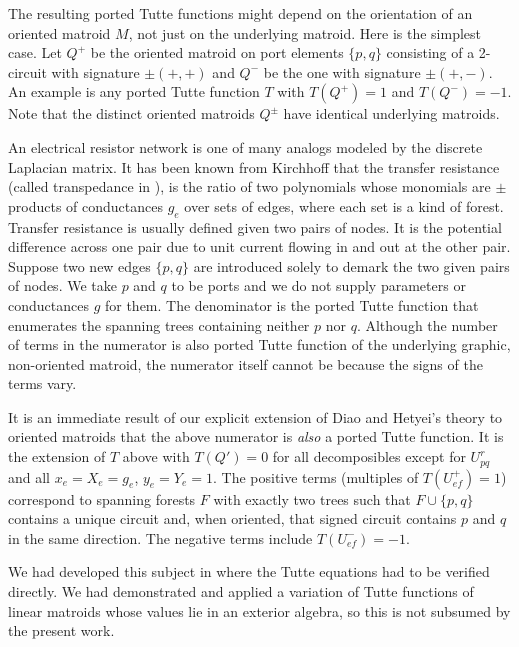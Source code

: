\documentclass[12pt,leqno]{amsart}
\theoremstyle{remark}
\begin{document}
The resulting
ported Tutte functions might depend on the orientation
of an oriented matroid $M$, not just on the
underlying matroid.  Here is the simplest case.
Let $Q^+$ be the oriented matroid
on port elements $\{p,q\}$ consisting of a 2-circuit
with signature $\pm(+,+)$ and $Q^-$ be the one with
signature $\pm(+,-)$.  An example is any ported Tutte
function $T$ with $T(Q^+)=1$ and $T(Q^-)=-1$.  Note that
the distinct oriented matroids $Q^{\pm}$ have identical 
underlying matroids.

An electrical resistor network is one of many analogs
modeled by the 
discrete Laplacian matrix\cite{DoyleSnellBook}.
It has been known from Kirchhoff\cite{Kirchhoff} that 
the transfer resistance
(called transpedance in \cite{BSST,TutteGraphBook}), 
is the ratio of two polynomials whose monomials 
are $\pm$ products of conductances $g_e$ over sets of edges,
where each set is a kind of forest.  
Transfer resistance is usually defined given two 
pairs of nodes.  It is the potential difference
across one pair due to unit current flowing in and
out at the other pair.
Suppose two new edges $\{p,q\}$ are introduced
solely to demark the two given pairs of nodes.
We take $p$ and $q$ to be ports and we do not 
supply parameters or conductances $g$ for them.
The denominator is the ported Tutte function that enumerates
the spanning trees containing neither $p$ nor $q$.  
Although the number of terms in the numerator
is also ported Tutte function of the underlying graphic, non-oriented 
matroid\cite{sdcPorted}, 
the numerator itself cannot be because the signs of the terms
vary.  

It is an immediate result of our explicit extension of
Diao and Hetyei's theory to oriented matroids 
that the above numerator is \textit{also} a ported Tutte function.
It is the extension of $T$ above with $T(Q')=0$ for
all decomposibles except for $U^r_{pq}$ and
all $x_e=X_e=g_e$, $y_e=Y_e=1$.   The positive terms
(multiples of $T(U^+_{ef})=1$) correspond to spanning forests
$F$ with exactly two trees such that $F\cup \{p,q\}$ contains
a unique circuit and, when oriented, that signed circuit contains 
$p$ and $q$ in the same direction.  The negative terms 
include $T(U^-_{ef})=-1$.
  
We had developed this subject in \cite{TutteEx}
where the Tutte equations had to be verified directly.
We had demonstrated and applied a variation of Tutte functions
of linear matroids whose values lie in an exterior algebra,
so this is not subsumed by the present work.
\end{document}

